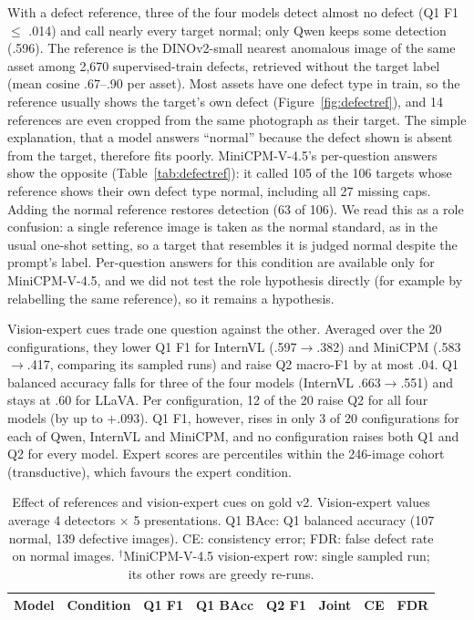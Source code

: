 \documentclass[11pt]{article}
\begin{document}
With a defect reference, three of the four models detect almost no defect (Q1 F1 $\le$ .014) and call nearly every target normal; only Qwen keeps some detection (.596). The reference is the DINOv2-small nearest anomalous image of the same asset among 2,670 supervised-train defects, retrieved without the target label (mean cosine .67--.90 per asset). Most assets have one defect type in train, so the reference usually shows the target's own defect (Figure~\ref{fig:defectref}), and 14 references are even cropped from the same photograph as their target. The simple explanation, that a model answers ``normal'' because the defect shown is absent from the target, therefore fits poorly. MiniCPM-V-4.5's per-question answers show the opposite (Table~\ref{tab:defectref}): it called 105 of the 106 targets whose reference shows their own defect type normal, including all 27 missing caps. Adding the normal reference restores detection (63 of 106). We read this as a role confusion: a single reference image is taken as the normal standard, as in the usual one-shot setting, so a target that resembles it is judged normal despite the prompt's label. Per-question answers for this condition are available only for MiniCPM-V-4.5, and we did not test the role hypothesis directly (for example by relabelling the same reference), so it remains a hypothesis.

Vision-expert cues trade one question against the other. Averaged over the 20 configurations, they lower Q1 F1 for InternVL (.597$\rightarrow$.382) and MiniCPM (.583$\rightarrow$.417, comparing its sampled runs) and raise Q2 macro-F1 by at most .04. Q1 balanced accuracy falls for three of the four models (InternVL .663$\rightarrow$.551) and stays at .60 for LLaVA. Per configuration, 12 of the 20 raise Q2 for all four models (by up to $+.093$). Q1 F1, however, rises in only 3 of 20 configurations for each of Qwen, InternVL and MiniCPM, and no configuration raises both Q1 and Q2 for every model. Expert scores are percentiles within the 246-image cohort (transductive), which favours the expert condition.

\begin{table}[t]
\centering
\caption{Effect of references and vision-expert cues on gold v2. Vision-expert values average 4 detectors $\times$ 5 presentations. Q1 BAcc: Q1 balanced accuracy (107 normal, 139 defective images). CE: consistency error; FDR: false defect rate on normal images. $^\dagger$MiniCPM-V-4.5 vision-expert row: single sampled run; its other rows are greedy re-runs.}
\label{tab:conditions}
\small
\begin{tabular}{llrrrrrr}
\toprule
Model & Condition & Q1 F1 & Q1 BAcc & Q2 F1 & Joint & CE & FDR \\
\midrule

\bottomrule
\end{tabular}
\end{table}
\end{document}
